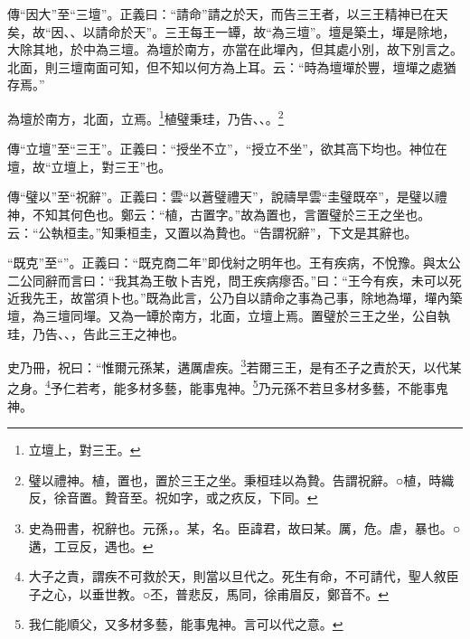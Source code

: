 {\noindent\zhuan{}\fzbyks 傳“因大”至“三壇”。正義曰：“請命”請之於天，而告三王者，以三王精神已在天矣，故“因、、以請命於天”。三王每王一罈，故“為三壇”。壇是築土，墠是除地，大除其地，於中為三壇。為壇於南方，亦當在此墠內，但其處小別，故下別言之。北面，則三壇南面可知，但不知以何方為上耳。云：“時為壇墠於豐，壇墠之處猶存焉。” \par}

為壇於南方，北面，立焉。\footnote{立壇上，對三王。}植璧秉珪，乃告、、。\footnote{璧以禮神。植，置也，置於三王之坐。秉桓珪以為贄。告謂祝辭。○植，時織反，徐音置。贄音至。祝如字，或之疚反，下同。}

{\noindent\zhuan{}\fzbyks 傳“立壇”至“三王”。正義曰：“授坐不立”，“授立不坐”，欲其高下均也。神位在壇，故“立壇上，對三王”也。 \par}

{\noindent\zhuan{}\fzbyks 傳“璧以”至“祝辭”。正義曰：雲“以蒼璧禮天”，說禱旱雲“圭璧既卒”，是璧以禮神，不知其何色也。鄭云：“植，古置字。”故為置也，言置璧於三王之坐也。云：“公執桓圭。”知秉桓圭，又置以為贄也。“告謂祝辭”，下文是其辭也。 \par}

{\noindent\shu{}\fzkt “既克”至“”。正義曰：“既克商二年”即伐紂之明年也。王有疾病，不悅豫。與太公二公同辭而言曰：“我其為王敬卜吉兇，問王疾病瘳否。”曰：“王今有疾，未可以死近我先王，故當須卜也。”既為此言，公乃自以請命之事為己事，除地為墠，墠內築壇，為三壇同墠。又為一罈於南方，北面，立壇上焉。置璧於三王之坐，公自執珪，乃告、、，告此三王之神也。 \par}

史乃冊，祝曰：“惟爾元孫某，遘厲虐疾。\footnote{史為冊書，祝辭也。元孫，。某，名。臣諱君，故曰某。厲，危。虐，暴也。○遘，工豆反，遇也。}若爾三王，是有丕子之責於天，以代某之身。\footnote{大子之責，謂疾不可救於天，則當以旦代之。死生有命，不可請代，聖人敘臣子之心，以垂世教。○丕，普悲反，馬同，徐甫眉反，鄭音不。}予仁若考，能多材多藝，能事鬼神。\footnote{我仁能順父，又多材多藝，能事鬼神。言可以代之意。}乃元孫不若旦多材多藝，不能事鬼神。


